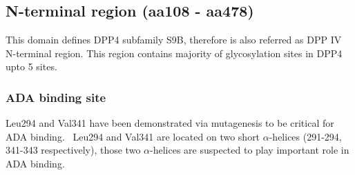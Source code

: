 \subsection{N-terminal region (aa108 - aa478)}

This domain defines DPP4 subfamily S9B, therefore is also referred as DPP IV N-terminal region. This region contains majority of  glycosylation sites in DPP4 upto 5 sites. 

\subsubsection{ADA binding site}
Leu294 and Val341 have been demonstrated via mutagenesis to be critical for ADA binding.~\cite{Abbott_1999} Leu294 and Val341 are located on two short $\alpha$-helices (291-294, 341-343 respectively), those two $\alpha$-helices are suspected to play important role in ADA binding. 